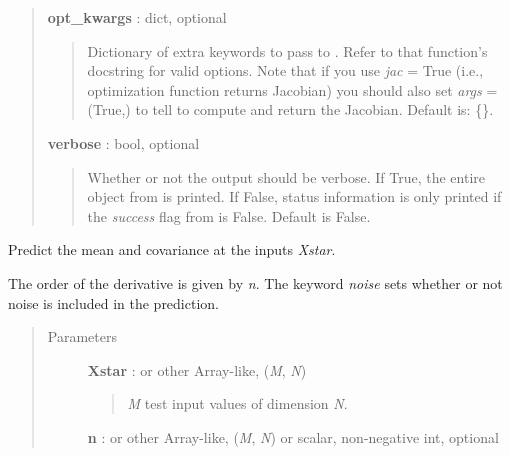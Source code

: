 \documentclass[letterpaper,10pt,english]{sphinxmanual}
\begin{document}
\begin{fulllineitems}
\begin{fulllineitems}
\begin{quote}
\begin{description}
\textbf{opt\_kwargs} : dict, optional
\begin{quote}

Dictionary of extra keywords to pass to
. Refer to that function's docstring for
valid options. Note that if you use \emph{jac} = True (i.e., optimization
function returns Jacobian) you should also set \emph{args} = (True,) to
tell {\hyperref[gptools:gptools.gaussian_process.GaussianProcess.update_hyperparameters]{}} to compute and return the
Jacobian. Default is: \{\}.
\end{quote}

\textbf{verbose} : bool, optional
\begin{quote}

Whether or not the output should be verbose. If
True, the entire  object from
 is printed. If False, status
information is only printed if the \emph{success} flag from
 is False. Default is False.
\end{quote}

\end{description}\end{quote}

\end{fulllineitems}


\begin{fulllineitems}
\label{gptools:gptools.gaussian_process.GaussianProcess.predict}
Predict the mean and covariance at the inputs \emph{Xstar}.

The order of the derivative is given by \emph{n}. The keyword \emph{noise} sets
whether or not noise is included in the prediction.
\begin{quote}\begin{description}
\item[{Parameters }] \leavevmode
\textbf{Xstar} :  or other Array-like, (\emph{M}, \emph{N})
\begin{quote}

\emph{M} test input values of dimension \emph{N}.
\end{quote}

\textbf{n} :  or other Array-like, (\emph{M}, \emph{N}) or scalar, non-negative int, optional
\begin{quote}


\end{quote}
\end{description}
\end{quote}
\end{fulllineitems}
\end{fulllineitems}
\end{document}
